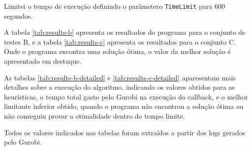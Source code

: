 \documentclass{article}
\begin{document}
Limitei o tempo de execução definindo o parâmetero {\tt TimeLimit} para 600 segundos.

A tabela \ref{tab:results-b} apresenta os resultados do programa para o conjunto de testes B, e a tabela \ref{tab:results-c} apresenta os resultados para o conjunto C.
Onde o programa encontra uma solução ótima, o valor da melhor solução é apresentado em destaque.

As tabelas \ref{tab:results-b-detailed} e \ref{tab:results-c-detailed} aparesentam mais detalhes sobre a execução do algoritmo, indicando os valores obtidos para as heurísticas, o tempo total gasto pelo Gurobi na execução do callback, e o melhor limitante inferior obtido, quando o programa não encontrou a solução ótima ou não conseguiu provar a otimalidade dentro do tempo limite.

Todos os valores indicados nas tabelas foram extraídos a partir dos logs gerados pelo Gurobi.
\end{document}
